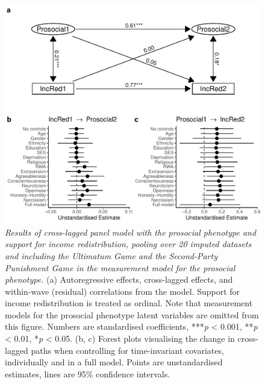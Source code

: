 \documentclass[
  man,floatsintext]{apa6}
\begin{document}
\begin{figure}
\centering
\includegraphics{manuscript_files/figure-latex/clpmPlotIncReddMFull-1.pdf}
\caption{\label{fig:clpmPlotIncReddMFull}\emph{Results of cross-lagged panel model with the
prosocial phenotype and support for income redistribution, pooling over 20
imputed datasets and including the Ultimatum Game and the Second-Party
Punishment Game in the measurement model for the prosocial phenotype.} (a)
Autoregressive effects, cross-lagged effects, and within-wave (residual)
correlations from the model. Support for income redistribution is treated as
ordinal. Note that measurement models for the prosocial phenotype latent
variables are omitted from this figure. Numbers are standardised coefficients,
***\emph{p} \textless{} 0.001, **\emph{p} \textless{} 0.01, *\emph{p} \textless{} 0.05. (b, c) Forest plots visualising
the change in cross-lagged paths when controlling for time-invariant covariates,
individually and in a full model. Points are unstandardised estimates, lines are
95\% confidence intervals.}
\end{figure}

\newpage
\end{document}
